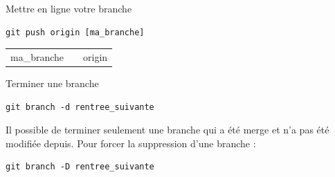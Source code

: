 \documentclass{beamer}
\begin{document}
\begin{frame}[fragile]{Mettre en ligne votre branche}

	\begin{lstlisting}[frame=single]
		git push origin [ma_branche]
	\end{lstlisting}	
	
	\begin{figure}
  		\centering
	\end{figure}

	\begin{center}
		\begin{tabular}{p{3.4cm}  p{1cm} p{2cm}}
		\centering ma\_branche & & origin
		\end{tabular}
	\end{center}
	
\end{frame}

\begin{frame}[fragile]{Terminer une branche}

	\begin{lstlisting}[frame=single]
		git branch -d rentree_suivante
	\end{lstlisting}
	\vfill{}
	Il possible de terminer seulement une branche qui a été merge et n'a pas été modifiée depuis.
	Pour forcer la suppression d'une branche :
	\begin{lstlisting}[frame=single]
		git branch -D rentree_suivante
	\end{lstlisting}
	
\end{frame}
\end{document}
